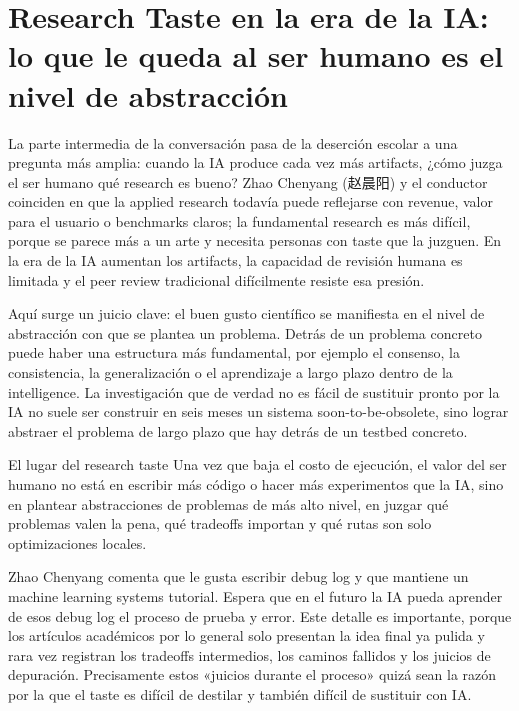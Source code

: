 \section{Research Taste en la era de la IA: lo que le queda al ser humano es el nivel de abstracción}

La parte intermedia de la conversación pasa de la deserción escolar a una pregunta más amplia: cuando la IA produce cada vez más artifacts, ¿cómo juzga el ser humano qué research es bueno? Zhao Chenyang (赵晨阳) y el conductor coinciden en que la applied research todavía puede reflejarse con revenue, valor para el usuario o benchmarks claros; la fundamental research es más difícil, porque se parece más a un arte y necesita personas con taste que la juzguen. En la era de la IA aumentan los artifacts, la capacidad de revisión humana es limitada y el peer review tradicional difícilmente resiste esa presión.

Aquí surge un juicio clave: el buen gusto científico se manifiesta en el nivel de abstracción con que se plantea un problema. Detrás de un problema concreto puede haber una estructura más fundamental, por ejemplo el consenso, la consistencia, la generalización o el aprendizaje a largo plazo dentro de la intelligence. La investigación que de verdad no es fácil de sustituir pronto por la IA no suele ser construir en seis meses un sistema soon-to-be-obsolete, sino lograr abstraer el problema de largo plazo que hay detrás de un testbed concreto.

\begin{importantbox}{El lugar del research taste}
Una vez que baja el costo de ejecución, el valor del ser humano no está en escribir más código o hacer más experimentos que la IA, sino en plantear abstracciones de problemas de más alto nivel, en juzgar qué problemas valen la pena, qué tradeoffs importan y qué rutas son solo optimizaciones locales.
\end{importantbox}

Zhao Chenyang comenta que le gusta escribir debug log y que mantiene un machine learning systems tutorial. Espera que en el futuro la IA pueda aprender de esos debug log el proceso de prueba y error. Este detalle es importante, porque los artículos académicos por lo general solo presentan la idea final ya pulida y rara vez registran los tradeoffs intermedios, los caminos fallidos y los juicios de depuración. Precisamente estos «juicios durante el proceso» quizá sean la razón por la que el taste es difícil de destilar y también difícil de sustituir con IA.

